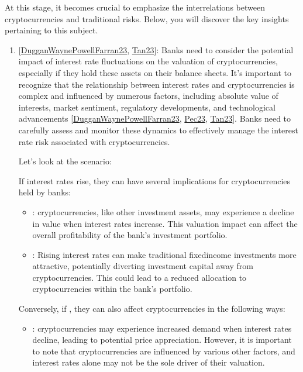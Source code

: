 \documentclass[letterpaper,10pt,english]{jupyterBook}
\begin{document}
\sphinxAtStartPar
At this stage, it becomes crucial to emphasize the interrelations between cryptocurrencies and traditional risks. Below, you will discover the key insights pertaining to this subject.
\begin{enumerate}
%
\item {} 
\sphinxAtStartPar
{} {[}\hyperlink{cite.ARM/arm:id146}{DugganWaynePowellFarran23}, \hyperlink{cite.ARM/arm:id149}{Tan23}{]}:
Banks need to consider the potential impact of interest rate fluctuations on the valuation of cryptocurrencies, especially if they hold these assets on their balance sheets. It’s important to recognize that the relationship between interest rates and cryptocurrencies is complex and influenced by numerous factors, including absolute value of interests, market sentiment, regulatory developments, and technological advancements {[}\hyperlink{cite.ARM/arm:id146}{DugganWaynePowellFarran23}, \hyperlink{cite.ARM/arm:id151}{Pec23}, \hyperlink{cite.ARM/arm:id149}{Tan23}{]}. Banks need to carefully assess and monitor these dynamics to effectively manage the interest rate risk associated with cryptocurrencies.

\sphinxAtStartPar
Let’s look at the  scenario:

\sphinxAtStartPar
If interest rates rise, they can have several implications for cryptocurrencies held by banks:
\begin{itemize}
\item {} 
\sphinxAtStartPar
{}: cryptocurrencies, like other investment assets, may experience a decline in value when interest rates increase. This valuation impact can affect the overall profitability of the bank’s investment portfolio.

\item {} 
\sphinxAtStartPar
{}: Rising interest rates can make traditional fixed\sphinxhyphen{}income investments more attractive, potentially diverting investment capital away from cryptocurrencies. This could lead to a reduced allocation to cryptocurrencies within the bank’s portfolio.

\end{itemize}

\sphinxAtStartPar
Conversely, if , they can also affect cryptocurrencies in the following ways:
\begin{itemize}
\item {} 
\sphinxAtStartPar
{}: cryptocurrencies may experience increased demand when interest rates decline, leading to potential price appreciation. However, it is important to note that cryptocurrencies are influenced by various other factors, and interest rates alone may not be the sole driver of their valuation.


\end{itemize}
\end{enumerate}
\end{document}

